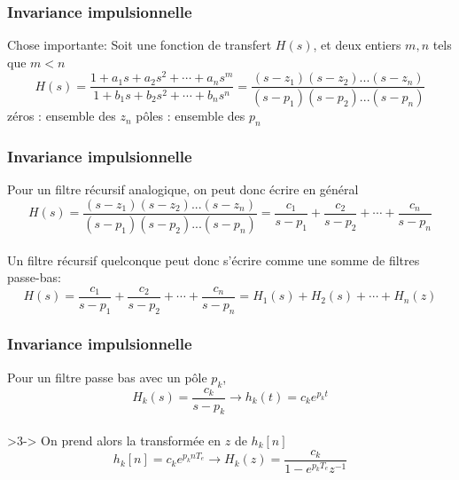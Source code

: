 \documentclass{beamer}
\begin{document}
\begin{frame}
\frametitle{Invariance impulsionnelle}
Chose importante:  Soit une fonction de transfert $H(s)$, et deux entiers $m,n$ tels que $m < n$
\vspace{0.2cm}
\[ H(s)  = \frac{1+ a_1 s + a_2 s^2 + \cdots + a_n s^m }{1+ b_1 s + b_2 s^2 + \cdots + b_n s^n} =  \frac{(s-z_1)(s-z_2)...(s-z_n)}{(s-p_1)(s-p_2)...(s-p_n)}\] 
\vspace{0.2cm}
zéros : ensemble des $z_n$ \hspace{2 cm}  pôles : ensemble des $p_n$
\vspace{0.2cm}

\end{frame}

\begin{frame}
\frametitle{Invariance impulsionnelle}
Pour un filtre récursif analogique, on peut donc écrire en général 
\[ H(s)  =  \frac{(s-z_1)(s-z_2)...(s-z_n)}{(s-p_1)(s-p_2)...(s-p_n)} = \frac{c_1}{s-p_1} + \frac{c_2}{s-p_2} + \cdots + \frac{c_n}{s-p_n} \] \\
\vspace{0.2cm}
Un filtre récursif quelconque peut donc s'écrire comme une somme de filtres passe-bas:\\
\vspace{0.2cm}
\[ H(s)  = \frac{c_1}{s-p_1} + \frac{c_2}{s-p_2} + \cdots + \frac{c_n}{s-p_n} = H_1(s) + H_2(s) + \cdots  + H_n(z)\]

\end{frame}

\begin{frame}
\frametitle{Invariance impulsionnelle} 
Pour un filtre passe bas avec un pôle $p_k$,\\
\vspace{0.1cm}
\[ H_k(s) = \frac{c_k}{s-p_k} \rightarrow h_k(t) = c_k e^{p_k t} \]\\
\vspace{0.1cm}
\only>3->{
\vspace{0.1cm}
On prend alors la transformée en $z$ de $h_k[n]$
\vspace{0.1cm}
\[ h_k[n] = c_k e^{p_k n T_e} \rightarrow H_k(z)= \frac{c_k}{1-e^{p_k T_e}z^{-1}}\]
}
\end{frame}
\end{document}
